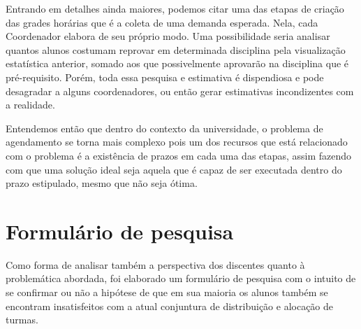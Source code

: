 
Entrando em detalhes ainda maiores, podemos citar uma das etapas de criação das grades horárias que é a coleta de uma demanda esperada. Nela, cada Coordenador elabora de seu próprio modo. Uma possibilidade seria analisar quantos alunos costumam reprovar em determinada disciplina pela visualização estatística anterior, somado aos que possivelmente aprovarão na disciplina que é pré-requisito. Porém, toda essa pesquisa e estimativa é dispendiosa e pode desagradar a alguns coordenadores, ou então gerar estimativas incondizentes com a realidade.

Entendemos então que dentro do contexto da universidade, o problema de agendamento se torna mais complexo pois um dos recursos que está relacionado com o problema é a existência de prazos em cada uma das etapas, assim fazendo com que uma solução ideal seja aquela que é capaz de ser executada dentro do prazo estipulado, mesmo que não seja ótima.

\section{Formulário de pesquisa} %


Como forma de analisar também a perspectiva dos discentes quanto à problemática abordada, foi elaborado um formulário de pesquisa com o intuito de se confirmar ou não a hipótese de que em sua maioria os alunos também se encontram insatisfeitos com a atual conjuntura de distribuição e alocação de turmas.

